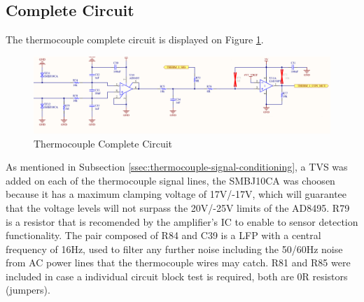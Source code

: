 	\subsection{Complete Circuit}
		The thermocouple complete circuit is displayed on Figure \ref{fig:thermocouple-complete-circuit}.

		\begin{figure}[htbp]
			\centering
				\includegraphics[scale=0.7]{figuras/fig-thermocouple-complete-circuit}
			\caption{Thermocouple Complete Circuit \cite{thermocouple-complete-conditioning-protection-circuit}}
			\label{fig:thermocouple-complete-circuit}
		\end{figure}		

		As mentioned in Subsection \ref{ssec:thermocouple-signal-conditioning}, a TVS was added on each of the thermocouple signal lines, the SMBJ10CA \cite{smbj10ca-datasheet} was choosen because it has a maximum clamping voltage of 17V/-17V, which will guarantee that the voltage levels will not surpass the 20V/-25V limits of the AD8495. R79 is a resistor that is recomended by the amplifier's IC to enable to sensor detection functionality. The pair composed of R84 and C39 is a LFP with a central frequency of 16Hz, used to filter any further noise including the 50/60Hz noise from AC power lines that the thermocouple wires may catch. R81 and R85 were included in case a individual circuit block test is required, both are 0R resistors (jumpers).